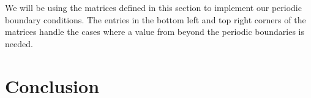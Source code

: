 \documentclass{myproject}
\begin{document}
We will be using the matrices defined in this section to implement our periodic boundary conditions. The entries in the bottom left and top right corners of the matrices handle the cases where a value from beyond the periodic boundaries is needed.

\section{Conclusion}

\nocite{iserles2009}
\nocite{trefethen2000}
\nocite{leveque1992}
\nocite{leveque2002}
\printbibliography
\end{document}
